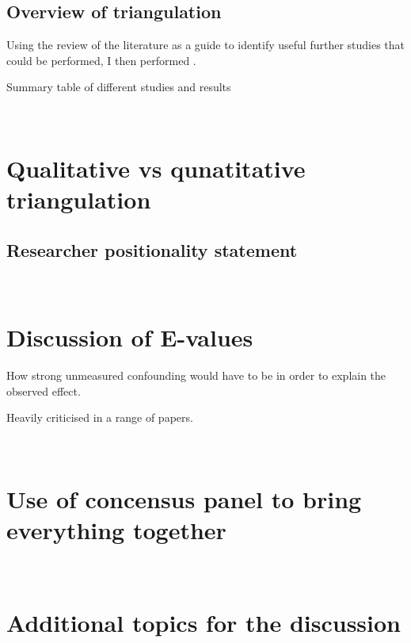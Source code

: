 \documentclass[a4paper, twoside]{templates/ociamthesis}
\begin{document}
\hypertarget{triangulation-overview}{%
\subsection{Overview of triangulation}\label{triangulation-overview}}

Using the review of the literature as a guide to identify useful further studies that could be performed, I then performed .

Summary table of different studies and results

~

\hypertarget{qualitative-vs-qunatitative-triangulation}{%
\section{Qualitative vs qunatitative triangulation}\label{qualitative-vs-qunatitative-triangulation}}

\hypertarget{researcher-positionality-statement}{%
\subsection{Researcher positionality statement}\label{researcher-positionality-statement}}

~

\hypertarget{discussion-of-e-values}{%
\section{Discussion of E-values}\label{discussion-of-e-values}}

How strong unmeasured confounding would have to be in order to explain the observed effect.

Heavily criticised in a range of papers.

~

\hypertarget{use-of-concensus-panel-to-bring-everything-together}{%
\section{Use of concensus panel to bring everything together}\label{use-of-concensus-panel-to-bring-everything-together}}

~

\hypertarget{additional-topics-for-the-discussion}{%
\section{Additional topics for the discussion}\label{additional-topics-for-the-discussion}}
\end{document}
